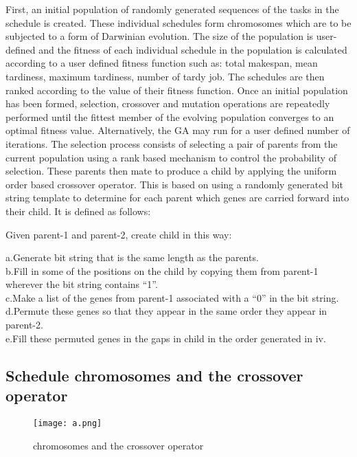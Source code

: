 \documentclass[a4paper,12pt]{report}
\begin{document}
{{{\begin{itemize}
		
		First, an initial population of randomly generated sequences of the tasks in the schedule is created. These individual schedules form chromosomes which are to be subjected to a form of Darwinian evolution. The size of the population is user-defined and the fitness of each individual schedule in the population is calculated according to a user defined fitness function such as: total makespan, mean tardiness, maximum tardiness, number of tardy job. The schedules are then ranked according to the value of their fitness function. Once an initial population has been formed, selection, crossover and mutation operations are repeatedly performed until the fittest member of the evolving population converges to an optimal fitness value. Alternatively, the GA may run for a user defined number of iterations. The selection process consists of selecting a pair of parents from the current population using a rank based mechanism to control the probability of selection. These parents then mate to produce a child by applying the uniform order based crossover operator. This is based on using a randomly generated bit string template to determine for each parent which genes are carried forward into their child. It is defined as follows:
		
		Given parent-1 and parent-2, create child in this way:
		
		a.Generate bit string that is the same length as the parents.
		\\b.Fill in some of the positions on the child by copying them from parent-1 wherever the bit string contains “1”.
		\\c.Make a list of the genes from parent-1 associated with a “0” in the bit string.
		\\d.Permute these genes so that they appear in the same order they appear in parent-2.
		\\e.Fill these permuted genes in the gaps in child in the order generated in iv.
		\\			
		
		\subsection{Schedule chromosomes and the crossover operator}
			
		\begin{figure}[h]
			\begin{center}
				\texttt{[image: a.png]}\\
			\end{center}
			\caption{ chromosomes and the crossover operator}
		\end{figure}
		

\end{itemize}}}}
\end{document}
